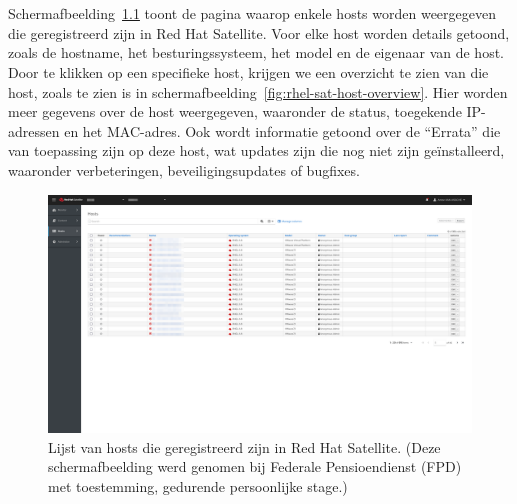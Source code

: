 
\chapter{}%
\label{ch:bijlage_red_hat_satellite}

Schermafbeelding~\ref{fig:rhel-sat-hosts} toont de pagina waarop enkele hosts worden weergegeven die geregistreerd zijn in Red Hat Satellite.
Voor elke host worden details getoond, zoals de hostname, het besturingssysteem, het model en de eigenaar van de host.
Door te klikken op een specifieke host, krijgen we een overzicht te zien van die host, zoals te zien is in schermafbeelding~\ref{fig:rhel-sat-host-overview}.
Hier worden meer gegevens over de host weergegeven, waaronder de status, toegekende IP-adressen en het MAC-adres.
Ook wordt informatie getoond over de ``Errata'' die van toepassing zijn op deze host, wat updates zijn die nog niet zijn ge\"installeerd, waaronder verbeteringen, beveiligingsupdates of bugfixes.

\begin{figure}[h!]
    \includegraphics[width=\textwidth]
    {./graphics/state-of-the-art/rhel-satellite/rhel-sat-hosts.png}
    \caption[Hosts geregistreerd in Red Hat Satellite.]{\label{fig:rhel-sat-hosts}Lijst van hosts die geregistreerd zijn in Red Hat Satellite. (Deze schermafbeelding werd genomen bij Federale Pensioendienst (FPD) met toestemming, gedurende persoonlijke stage.)}
\end{figure}

